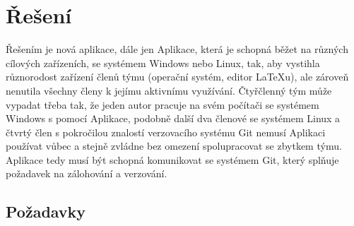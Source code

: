 \chapter{Řešení}
Řešením je nová aplikace, dále jen Aplikace, která je schopná běžet na různých cílových zařízeních, se systémem Windows nebo Linux, tak, aby vystihla různorodost zařízení členů týmu (operační systém, editor LaTeXu), ale zároveň nenutila všechny členy k jejímu aktivnímu využívání. Čtyřčlenný tým může vypadat třeba tak, že jeden autor pracuje na svém počítači se systémem Windows s pomocí Aplikace, podobně další dva členové se systémem Linux a čtvrtý člen s pokročilou znalostí verzovacího systému Git nemusí Aplikaci používat vůbec a stejně zvládne bez omezení spolupracovat se zbytkem týmu. Aplikace tedy musí být schopná komunikovat se systémem Git, který splňuje požadavek na zálohování a verzování.

\section{Požadavky}

